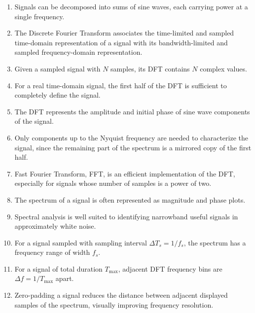 \begin{enumerate}[label=\arabic*.]
    \item Signals can be decomposed into sums of sine waves, each carrying power at a single frequency.
    
    \item The Discrete Fourier Transform associates the time-limited and sampled time-domain representation of a signal with its bandwidth-limited and sampled frequency-domain representation.
    
    \item Given a sampled signal with $N$ samples, its DFT contains $N$ complex values.
    
    \item For a real time-domain signal, the first half of the DFT is sufficient to completely define the signal.
    
    \item The DFT represents the amplitude and initial phase of sine wave components of the signal.
    
    \item Only components up to the Nyquist frequency are needed to characterize the signal, since the remaining part of the spectrum is a mirrored copy of the first half.
    
    \item Fast Fourier Transform, FFT, is an efficient implementation of the DFT, especially for signals whose number of samples is a power of two.
    
    \item The spectrum of a signal is often represented as magnitude and phase plots.
    
    \item Spectral analysis is well suited to identifying narrowband useful signals in approximately white noise.
    
    \item For a signal sampled with sampling interval $\Delta T_s = 1/f_s$, the spectrum has a frequency range of width $f_s$.
    
    \item For a signal of total duration $T_{\max}$, adjacent DFT frequency bins are $\Delta f = 1/T_{\max}$ apart.
    
    \item Zero-padding a signal reduces the distance between adjacent displayed samples of the spectrum, visually improving frequency resolution.
    

\end{enumerate}
